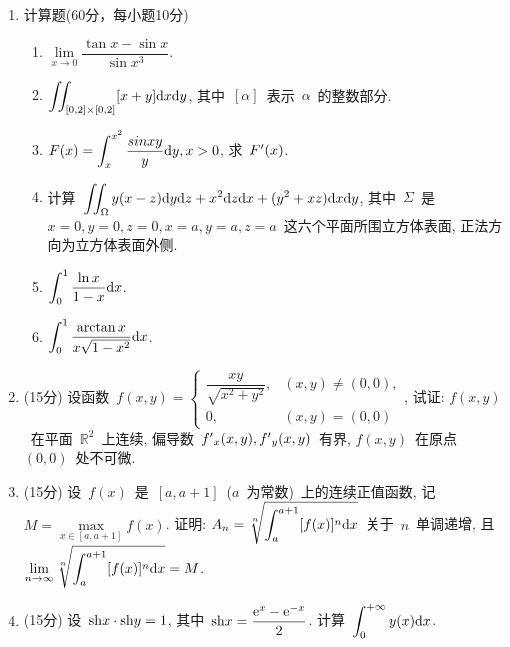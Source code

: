 \documentclass[UTF8,a4paper,11pt]{article}
\begin{document}
\begin{enumerate}
	\item 计算题(60分，每小题10分)
	      \begin{enumerate}
		      \item $\lim\limits_{x\to 0}\dfrac{\tan{x}-\sin{x}}{\sin{x^3}}$.\\
		            \vspace{2em}
		      \item $\displaystyle\iint_{[0,2]\times[0,2]}[x+y]\mathrm{d}x\mathrm{d}y$, 其中~$[\alpha]$~表示~$\alpha$~的整数部分.\\
		            \vspace{2em}
		      \item $\displaystyle F(x)=\int_{x}^{x^2}\dfrac{sin{xy}}{y}\mathrm{d}y, x>0$, 求~$F\rq{}(x)$.\\
		            \vspace{2em}
		      \item 计算~$\displaystyle \iint_{\Omega} y(x-z)\mathrm{d}y\mathrm{d}z+x^2\mathrm{d}z\mathrm{d}x+(y^2+xz)\mathrm{d}x\mathrm{d}y$, 其中~$\Sigma$~是~$x=0,y=0,z=0,x=a,y=a,z=a$~这六个平面所围立方体表面, 正法方向为立方体表面外侧.
		            \vspace{2em}
		      \item $\displaystyle\int_0^1 \dfrac{\ln{x}}{1-x}\mathrm{d}x$.
		            \vspace{2em}
		      \item $\displaystyle\int_0^1 \dfrac{\arctan{x}}{x\sqrt{1-x^2}}\mathrm{d}x$.
		            \vspace{2em}
	      \end{enumerate}
	\item (15分) 设函数~$f(x,y)=\begin{cases}\dfrac{xy}{\sqrt{x^2+y^2}},&(x,y)\neq(0,0),\\0,& (x,y)=(0,0)\end{cases}$, 试证: $f(x,y)$~在平面~$\mathbb{R}^2$~上连续, 偏导数~$f\rq{}_{x}(x,y),f\rq{}_{y}(x,y)$~有界, $f(x,y)$~在原点~$(0,0)$~处不可微.
	      \vspace{2em}
	\item (15分) 设~$f(x)$~是~$[a,a+1]$~($a$~为常数)~上的连续正值函数, 记~$M=\max\limits_{x\in[a,a+1]}f(x)$. 证明: $\displaystyle A_n=\sqrt[n]{\int_a^{a+1}[f(x)]^n\mathrm{d}x}$~关于~$n$~单调递增, 且~$\displaystyle\lim\limits_{n\to\infty}\sqrt[n]{\int_{a}^{a+1}[f(x)]^n\mathrm{d}x}=M$.
	      \vspace{2em}
	\item (15分) 设~$\mathrm{sh}{x}\cdot\mathrm{sh}{y}=1$, 其中~$\mathrm{sh}{x}=\dfrac{\mathrm{e}^{x}-\mathrm{e}^{-x}}{2}$. 计算~$\displaystyle\int_0^{+\infty} y(x)\mathrm{d}x$.

\end{enumerate}
\end{document}
